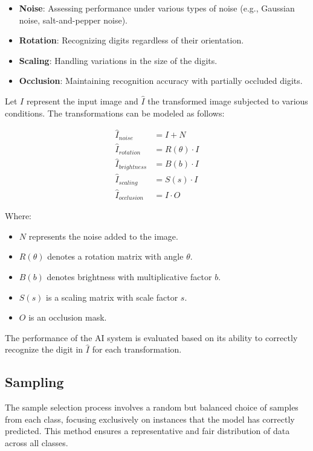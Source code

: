\documentclass[10pt, conference, a4paper, final]{IEEEtran}
\begin{document}
\begin{itemize}
    \item \textbf{Noise}: Assessing performance under various types of noise (e.g., Gaussian noise, salt-and-pepper noise).
    \item \textbf{Rotation}: Recognizing digits regardless of their orientation.
    \item \textbf{Scaling}: Handling variations in the size of the digits.

    \item \textbf{Occlusion}: Maintaining recognition accuracy with partially occluded digits.

\end{itemize}

Let \( I \) represent the input image and \( \hat{I} \) the transformed image subjected to various conditions. The transformations can be modeled as follows:

\begin{align}
    \hat{I}_{noise} &= I + N \\
    \hat{I}_{rotation} &= R(\theta) \cdot I \\
    \hat{I}_{brightness} &= B(b) \cdot I \\
    \hat{I}_{scaling} &= S(s) \cdot I \\
    \hat{I}_{occlusion} &= I \cdot O 
\end{align}

Where:
\begin{itemize}
    \item \( N \) represents the noise added to the image.
    \item \( R(\theta) \) denotes a rotation matrix with angle \( \theta \).
    \item \( B(b) \) denotes brightness with multiplicative factor \( b \).
    \item \( S(s) \) is a scaling matrix with scale factor \( s \).
    \item \( O \) is an occlusion mask.
\end{itemize}

The performance of the AI system is evaluated based on its ability to correctly recognize the digit in \( \hat{I} \) for each transformation.



\subsection{Sampling}
 The sample selection process involves a random but balanced choice of samples from each class, focusing exclusively on instances that the model has correctly predicted. This method ensures a representative and fair distribution of data across all classes.
\end{document}
